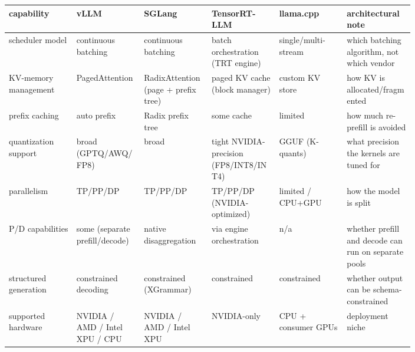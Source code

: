 \nopagebreak[4]
\begin{longtable}[]{@{}
  >{\raggedright\arraybackslash}p{0.1327\linewidth}
  >{\raggedright\arraybackslash}p{0.1327\linewidth}
  >{\raggedright\arraybackslash}p{0.1327\linewidth}
  >{\raggedright\arraybackslash}p{0.1327\linewidth}
  >{\raggedright\arraybackslash}p{0.1327\linewidth}
  >{\raggedright\arraybackslash}p{0.1327\linewidth}@{}}
\toprule\noalign{}
\begin{minipage}[b]{\linewidth}\raggedright
capability
\end{minipage} & \begin{minipage}[b]{\linewidth}\raggedright
vLLM
\end{minipage} & \begin{minipage}[b]{\linewidth}\raggedright
SGLang
\end{minipage} & \begin{minipage}[b]{\linewidth}\raggedright
TensorRT-LLM
\end{minipage} & \begin{minipage}[b]{\linewidth}\raggedright
llama.cpp
\end{minipage} & \begin{minipage}[b]{\linewidth}\raggedright
architectural note
\end{minipage} \\
\midrule\noalign{}
\endhead
\bottomrule\noalign{}
\endlastfoot
scheduler model & continuous batching & continuous batching & batch
orchestration (TRT engine) & single/multi-stream & which batching
algorithm, not which vendor \\
\noalign{\label{tab:11.2}}
KV-memory management & PagedAttention & RadixAttention (page + prefix
tree) & paged KV cache (block manager) & custom KV store & how KV is
allocated/fragmented \\
prefix caching & auto prefix & Radix prefix tree & some cache & limited
& how much re-prefill is avoided \\
quantization support & broad (GPTQ/AWQ/FP8) & broad & tight
NVIDIA-precision (FP8/INT8/INT4) & GGUF (K-quants) & what precision the
kernels are tuned for \\
parallelism & TP/PP/DP & TP/PP/DP & TP/PP/DP (NVIDIA-optimized) &
limited / CPU+GPU & how the model is split \\
P/D capabilities & some (separate prefill/decode) & native
disaggregation & via engine orchestration & n/a & whether prefill and
decode can run on separate pools \\
structured generation & constrained decoding & constrained (XGrammar) &
constrained & constrained & whether output can be schema-constrained \\
supported hardware & NVIDIA / AMD / Intel XPU / CPU & NVIDIA / AMD /
Intel XPU & NVIDIA-only & CPU + consumer GPUs & deployment niche \\
\end{longtable}

